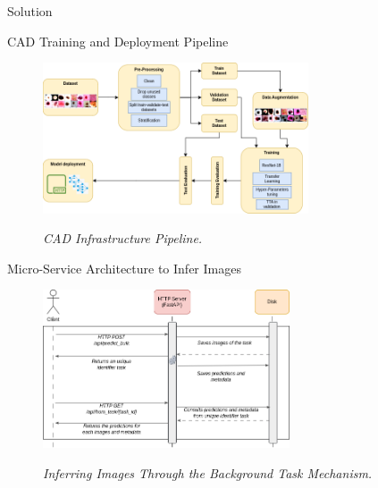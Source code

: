 \documentclass[dvipsnames,mathserif]{beamer}
\begin{document}
{\begin{frame}
    \end{frame}


    \begin{frame}
      \begin{center}
        \Huge Solution
      \end{center}
    \end{frame}


    \begin{frame}

      \large CAD Training and Deployment Pipeline
      \vspace{0.25cm}

      \begin{figure}[H]
        \centering
        \includegraphics[width=0.7\textwidth]{images/Pipeline.drawio.png}
        \caption[CAD Infrastructure Pipeline]{\textit{CAD Infrastructure Pipeline.}}
        {\label{fig:cad-infrastructure-training-system}}
      \end{figure}

    \end{frame}

    \begin{frame}
      \large Micro-Service Architecture to Infer Images
      \vspace{0.25cm}

      \begin{figure}[H]
        \centering
        \includegraphics[width=0.65\textwidth]{images/BackgroundTask.drawio.png}
        \caption[Inferring Images Through the Background Task Mechanism]{\textit{Inferring Images Through the Background Task Mechanism.  }}
        {\label{fig:backgrond-task}}
      \end{figure}


\end{frame}}
\end{document}
